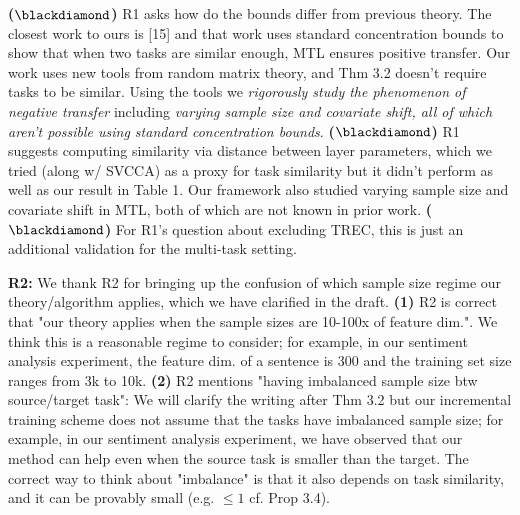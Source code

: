 \documentclass{article}
\begin{document}
\vspace{-0.045in}
\textbf{($\blackdiamond$)} R1 asks how do the bounds differ from previous theory. The closest work to ours is [15] and that work uses standard concentration bounds to show that when two tasks are similar enough, MTL ensures positive transfer.
Our work uses new tools from random matrix theory, and Thm 3.2 doesn't require tasks to be similar.
Using the tools we \textit{rigorously study the phenomenon of negative transfer} including \textit{varying sample size and covariate shift, all of which aren't possible using standard concentration bounds}.
\textbf{($\blackdiamond$)} R1 suggests computing similarity via distance between layer parameters,
which we tried (along w/ SVCCA) as a proxy for task similarity but it didn't perform as well as our result in Table 1. Our framework also studied varying sample size and covariate shift in MTL, both of which are not known in prior work.
\textbf{($\blackdiamond$)} For R1's question about excluding TREC, this is just an additional validation for the multi-task setting.
%

\vspace{-0.025in}
\textbf{R2:}
We thank R2 for bringing up the confusion of which sample size regime our theory/algorithm applies, which we have clarified in the draft.
\textbf{(1)} R2 is correct that "our theory applies when the sample sizes are 10-100x of feature dim.".
We think this is a reasonable regime to consider; for example, in our sentiment analysis experiment, the feature dim. of a sentence is 300 and the training set size ranges from 3k to 10k.
\textbf{(2)} R2 mentions "having imbalanced sample size btw source/target task": We will clarify the writing after Thm 3.2 but our incremental training scheme does not assume that the tasks have imbalanced sample size; for example, in our sentiment analysis experiment, we have observed that our method can help even when the source task is smaller than the target.
The correct way to think about "imbalance" is that it also depends on task similarity, and it can be provably small (e.g. $\le 1$ cf. Prop 3.4).
\end{document}

